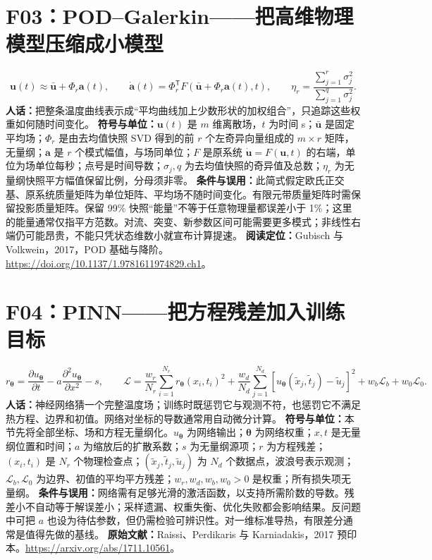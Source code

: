 \documentclass[UTF8,zihao=-4,openany,oneside,fontset=windows]{ctexbook}
\begin{document}
\section{F03：POD--Galerkin——把高维物理模型压缩成小模型}
\begin{equation}
 \mathbf u(t)\approx\bar{\mathbf u}+\Phi_r\mathbf a(t),\qquad
 \dot{\mathbf a}(t)=\Phi_r^{\mathsf T}F(\bar{\mathbf u}+\Phi_r\mathbf a(t),t),\qquad
 \eta_r=\frac{\sum_{j=1}^{r}\sigma_j^2}{\sum_{j=1}^{q}\sigma_j^2}.
\end{equation}
\textbf{人话：}把整条温度曲线表示成“平均曲线加上少数形状的加权组合”，只追踪这些权重如何随时间变化。
\textbf{符号与单位：}$\mathbf u(t)$ 是 $m$ 维离散场，$t$ 为时间 s；$\bar{\mathbf u}$ 是固定平均场；$\Phi_r$ 是由去均值快照 SVD 得到的前 $r$ 个左奇异向量组成的 $m\times r$ 矩阵，无量纲；$\mathbf a$ 是 $r$ 个模式幅值，与场同单位；$F$ 是原系统 $\dot{\mathbf u}=F(\mathbf u,t)$ 的右端，单位为场单位每秒；点号是时间导数；$\sigma_j,q$ 为去均值快照的奇异值及总数；$\eta_r$ 为无量纲快照平方幅值保留比例，分母须非零。
\textbf{条件与误用：}此简式假定欧氏正交基、原系统质量矩阵为单位矩阵、平均场不随时间变化。有限元带质量矩阵时需保留投影质量矩阵。保留 99\% 快照“能量”不等于任意物理量都误差小于 1\%；这里的能量通常仅指平方范数。对流、突变、新参数区间可能需要更多模式；非线性右端仍可能昂贵，不能只凭状态维数小就宣布计算提速。
\textbf{阅读定位：}Gubisch 与 Volkwein，2017，POD 基础与降阶。\url{https://doi.org/10.1137/1.9781611974829.ch1}。

\section{F04：PINN——把方程残差加入训练目标}
\begin{equation}
 r_{\boldsymbol\theta}=\frac{\partial u_{\boldsymbol\theta}}{\partial t}
 -a\frac{\partial^2u_{\boldsymbol\theta}}{\partial x^2}-s,\qquad
 \mathcal L=\frac{w_r}{N_r}\sum_{i=1}^{N_r}r_{\boldsymbol\theta}(x_i,t_i)^2
 +\frac{w_d}{N_d}\sum_{j=1}^{N_d}\left[u_{\boldsymbol\theta}(\tilde x_j,\tilde t_j)-\tilde u_j\right]^2
 +w_b\mathcal L_b+w_0\mathcal L_0.
\end{equation}
\textbf{人话：}神经网络猜一个完整温度场；训练时既惩罚它与观测不符，也惩罚它不满足热方程、边界和初值。网络对坐标的导数通常用自动微分计算。
\textbf{符号与单位：}本节先将全部坐标、场和方程无量纲化。$u_{\boldsymbol\theta}$ 为网络输出；$\boldsymbol\theta$ 为网络权重；$x,t$ 是无量纲位置和时间；$a$ 为缩放后的扩散系数；$s$ 为无量纲源项；$r$ 为方程残差；$(x_i,t_i)$ 是 $N_r$ 个物理检查点；$(\tilde x_j,\tilde t_j,\tilde u_j)$ 为 $N_d$ 个数据点，波浪号表示观测；$\mathcal L_b,\mathcal L_0$ 为边界、初值的平均平方残差；$w_r,w_d,w_b,w_0>0$ 是权重；所有损失项无量纲。
\textbf{条件与误用：}网络需有足够光滑的激活函数，以支持所需阶数的导数。残差小不自动等于解误差小；采样遗漏、权重失衡、优化失败都会影响结果。反问题中可把 $a$ 也设为待估参数，但仍需检验可辨识性。对一维标准导热，有限差分通常是值得先做的基线。
\textbf{原始文献：}Raissi、Perdikaris 与 Karniadakis，2017 预印本。\url{https://arxiv.org/abs/1711.10561}。
\end{document}
